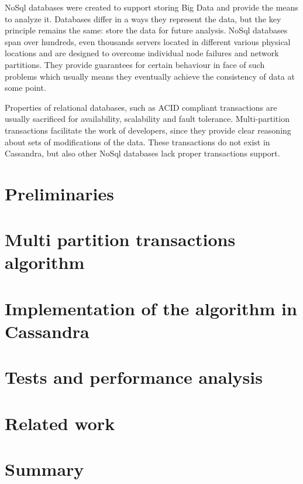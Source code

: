 \documentclass[runningheads,a4paper]{llncs}
\begin{document}
NoSql databases were created to support storing Big Data and provide the means to analyze it. 
Databases differ in a ways they represent the data, but the key principle remains the same: 
store the data for future analysis. NoSql databases span over hundreds, even thousands servers 
located in different various physical locations and are designed to overcome individual node 
failures and network partitions. They provide guarantees for certain behaviour in face of such
problems which usually means they eventually achieve the consistency of data at some point.

Properties of relational databases, such as ACID compliant transactions are usually sacrificed 
for availability, scalability and fault tolerance. Multi-partition transactions facilitate 
the work of developers, since they provide clear reasoning about sets of modifications of the data. 
These transactions do not exist in Cassandra, but also other NoSql databases lack proper 
transactions support. 


\section{Preliminaries}





\section{Multi partition transactions algorithm}

\section{Implementation of the algorithm in Cassandra}

\section{Tests and performance analysis}

\section{Related work}


\section{Summary}



 
\end{document}
